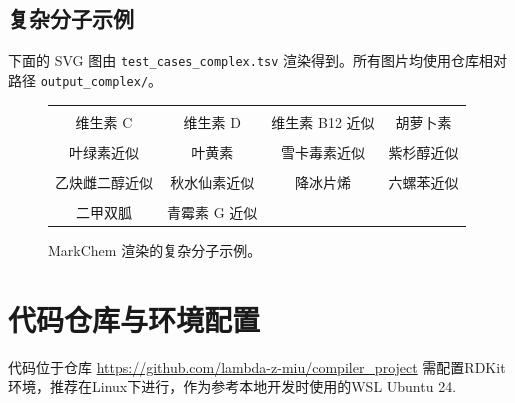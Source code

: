 \documentclass[UTF8,a4paper,11pt]{ctexart}
\begin{document}
\subsection{复杂分子示例}

下面的 SVG 图由 \verb|test_cases_complex.tsv| 渲染得到。所有图片均使用仓库相对路径 \verb|output_complex/|。

\begin{figure}[htbp]
\centering
\begin{tabular}{cccc}
 &
 &
 &
 \\
维生素 C & 维生素 D & 维生素 B12 近似 & 胡萝卜素 \\
 &
 &
 &
 \\
叶绿素近似 & 叶黄素 & 雪卡毒素近似 & 紫杉醇近似 \\
 &
 &
 &
 \\
乙炔雌二醇近似 & 秋水仙素近似 & 降冰片烯 & 六螺苯近似 \\
 &
 &
 &
 \\
二甲双胍 & 青霉素 G 近似 & & \\
\end{tabular}
\caption{MarkChem 渲染的复杂分子示例。}
\end{figure}
\section{代码仓库与环境配置}
代码位于仓库 \url{https://github.com/lambda-z-miu/compiler_project} 
需配置RDKit环境，推荐在Linux下进行，作为参考本地开发时使用的WSL Ubuntu 24.
\end{document}
